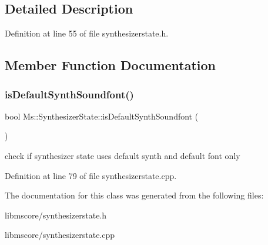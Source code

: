\subsection{Detailed Description}


Definition at line 55 of file synthesizerstate.\+h.



\subsection{Member Function Documentation}
\mbox{\label{class_ms_1_1_synthesizer_state_aa308307dab5d80434cea75cff5355ad9}} 
\subsubsection{\texorpdfstring{is\+Default\+Synth\+Soundfont()}{isDefaultSynthSoundfont()}}
{\footnotesize\ttfamily bool Ms\+::\+Synthesizer\+State\+::is\+Default\+Synth\+Soundfont (\begin{DoxyParamCaption}{ }\end{DoxyParamCaption})}

check if synthesizer state uses default synth and default font only 

Definition at line 79 of file synthesizerstate.\+cpp.



The documentation for this class was generated from the following files\+:\begin{DoxyCompactItemize}
\item 
libmscore/synthesizerstate.\+h\item 
libmscore/synthesizerstate.\+cpp\end{DoxyCompactItemize}
